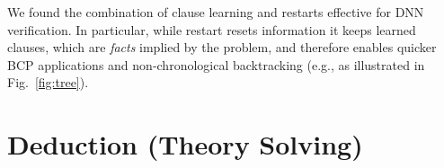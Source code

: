 \documentclass[oneside,11pt,dvipsnames]{book}
\numberwithin{equation}{section}
\theoremstyle{definition}
\theoremstyle{remark}
\newcommand{\tvn}[1]{\iftoggle{usecomment}{{\color{red}{[TVN]: #1}}}{}}
\newcommand{\mbd}[1]{\iftoggle{usecomment}{{\color{magenta}{[MBD]: #1}}}{}}
\newcommand{\tool}{\texttt{NeuralSAT}}
\begin{document}
We found the combination of clause learning and restarts effective for DNN verification. In particular, while restart resets information  it keeps learned clauses, which  are \emph{facts} implied by the problem, and therefore enables quicker BCP applications and non-chronological backtracking (e.g., as illustrated in Fig.~\ref{fig:tree}).





\section{Deduction (Theory Solving)}\label{sec:deduction}
\end{document}
